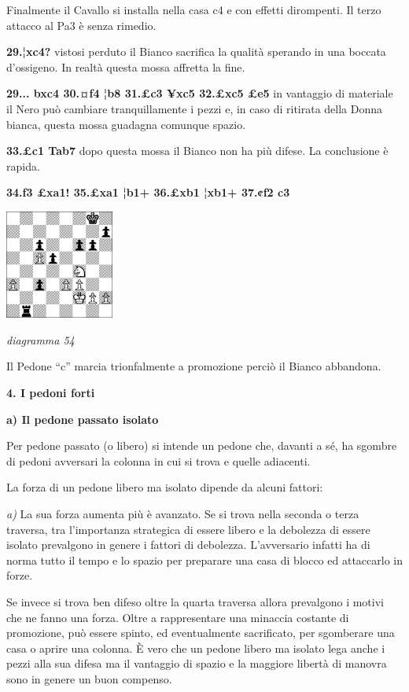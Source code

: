 \documentclass[
]{article}
\begin{document}
Finalmente il Cavallo si installa nella casa c4 e con effetti
dirompenti. Il terzo attacco al Pa3 è senza rimedio.

\textbf{29.¦xc4?} vistosi perduto il Bianco sacrifica la qualità
sperando in una boccata d'ossigeno. In realtà questa mossa affretta la
fine.

\textbf{29... bxc4 30.¤f4 ¦b8 31.£c3 ¥xc5 32.£xc5 £e5} in vantaggio di
materiale il Nero può cambiare tranquillamente i pezzi e, in caso di
ritirata della Donna bianca, questa mossa guadagna comunque spazio.

\textbf{33.£c1 Tab7} dopo questa mossa il Bianco non ha più difese. La
conclusione è rapida.

\textbf{34.f3 £xa1! 35.£xa1 ¦b1+ 36.£xb1 ¦xb1+ 37.¢f2 c3}

\includegraphics[width=1.40972in,height=1.40972in]{vertopal_109f12be458a423d8f3cc838880eaea2/media/image54.png}

\emph{diagramma 54}

Il Pedone ``c'' marcia trionfalmente a promozione perciò il Bianco
abbandona.

\textbf{4. I pedoni forti}

\textbf{a) Il pedone passato isolato}

Per pedone passato (o libero) si intende un pedone che, davanti a sé, ha
sgombre di pedoni avversari la colonna in cui si trova e quelle
adiacenti.

La forza di un pedone libero ma isolato dipende da alcuni fattori:

\emph{a)} La sua forza aumenta più è avanzato. Se si trova nella seconda
o terza traversa, tra l'importanza strategica di essere libero e la
debolezza di essere isolato prevalgono in genere i fattori di debolezza.
L'avversario infatti ha di norma tutto il tempo e lo spazio per
preparare una casa di blocco ed attaccarlo in forze.

Se invece si trova ben difeso oltre la quarta traversa allora prevalgono
i motivi che ne fanno una forza. Oltre a rappresentare una minaccia
costante di promozione, può essere spinto, ed eventualmente sacrificato,
per sgomberare una casa o aprire una colonna. È vero che un pedone
libero ma isolato lega anche i pezzi alla sua difesa ma il vantaggio di
spazio e la maggiore libertà di manovra sono in genere un buon compenso.
\end{document}
